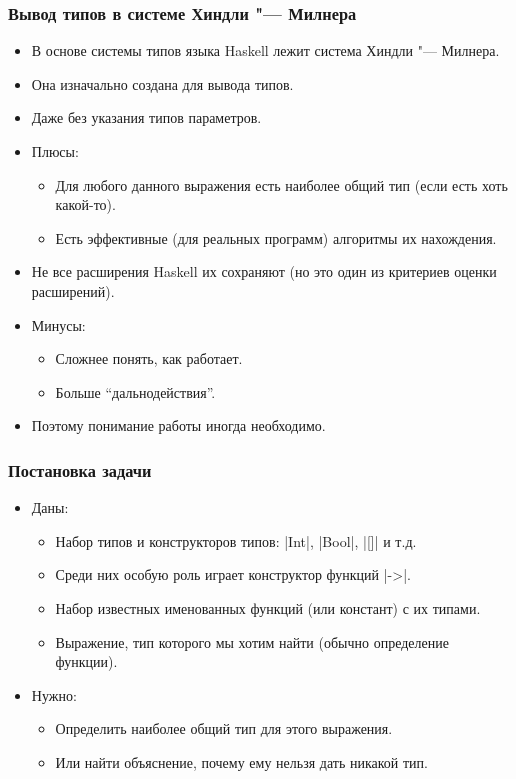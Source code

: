 \documentclass[11pt]{beamer}
\begin{document}
\begin{frame}[fragile]
  \frametitle{Вывод типов в системе Хиндли "--- Милнера}
  \begin{itemize}
    \item В основе системы типов языка Haskell лежит система Хиндли "--- Милнера.
    \item Она изначально создана для вывода типов.
          \pause
    \item Даже без указания типов параметров.
          \pause
    \item Плюсы:
          \begin{itemize}
            \pause
            \item Для любого данного выражения есть наиболее общий тип (если есть хоть какой-то).
                  \pause
            \item Есть эффективные (для реальных программ) алгоритмы их нахождения.
          \end{itemize}
          \pause
    \item Не все расширения Haskell их сохраняют (но это один из критериев оценки расширений).
          \pause
    \item Минусы:
          \begin{itemize}
            \pause
            \item Сложнее понять, как работает.
                  \pause
            \item Больше \enquote{дальнодействия}.
          \end{itemize}
          \pause
    \item Поэтому понимание работы иногда необходимо.
  \end{itemize}
\end{frame}

\begin{frame}[fragile]
  \frametitle{Постановка задачи}
  \begin{itemize}
    \item Даны:
          \begin{itemize}
            \item Набор типов и конструкторов типов: \haskinline|Int|, \haskinline|Bool|, \haskinline|[]| и т.д.
            \item Среди них особую роль играет конструктор функций \haskinline|->|.
            \item Набор известных именованных функций (или констант) с их типами.
            \item Выражение, тип которого мы хотим найти (обычно определение функции).
          \end{itemize}
          \pause
    \item Нужно:
          \begin{itemize}
            \item Определить наиболее общий тип для этого выражения.
                  \pause
            \item Или найти объяснение, почему ему нельзя дать никакой тип.
          \end{itemize}
  \end{itemize}
\end{frame}
\end{document}
